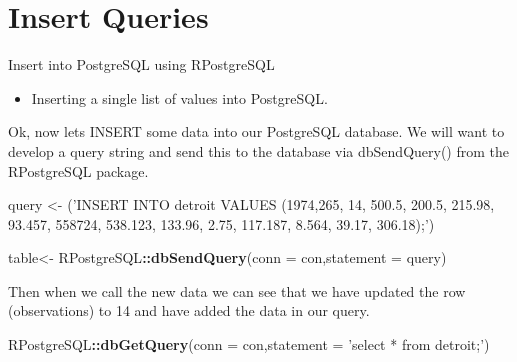 \documentclass[]{book}
\newenvironment{Shaded}{\begin{snugshade}}{\end{snugshade}}
\newcommand{\KeywordTok}[1]{\textcolor[rgb]{0.13,0.29,0.53}{\textbf{#1}}}
\newcommand{\DataTypeTok}[1]{\textcolor[rgb]{0.13,0.29,0.53}{#1}}
\newcommand{\StringTok}[1]{\textcolor[rgb]{0.31,0.60,0.02}{#1}}
\newcommand{\OperatorTok}[1]{\textcolor[rgb]{0.81,0.36,0.00}{\textbf{#1}}}
\newcommand{\NormalTok}[1]{#1}
\providecommand{\tightlist}{%
  \setlength{\itemsep}{0pt}\setlength{\parskip}{0pt}}
\begin{document}
\section{Insert Queries}\label{insert-queries}

Insert into PostgreSQL using RPostgreSQL

\begin{itemize}
\tightlist
\item
  Inserting a single list of values into PostgreSQL.
\end{itemize}

Ok, now lets INSERT some data into our PostgreSQL database. We will want
to develop a query string and send this to the database via
dbSendQuery() from the RPostgreSQL package.

\begin{Shaded}
\begin{Highlighting}[]
\NormalTok{query <-}\StringTok{ }\NormalTok{(}\StringTok{'INSERT INTO detroit VALUES (1974,265, 14, 500.5, 200.5, 215.98, 93.457, 558724, 538.123, 133.96, 2.75, 117.187, 8.564, 39.17, 306.18);'}\NormalTok{)}

\NormalTok{table<-}\StringTok{ }\NormalTok{RPostgreSQL}\OperatorTok{::}\KeywordTok{dbSendQuery}\NormalTok{(}\DataTypeTok{conn =}\NormalTok{ con,}\DataTypeTok{statement =}\NormalTok{ query)}
\end{Highlighting}
\end{Shaded}

Then when we call the new data we can see that we have updated the row
(observations) to 14 and have added the data in our query.

\begin{Shaded}
\begin{Highlighting}[]
\NormalTok{RPostgreSQL}\OperatorTok{::}\KeywordTok{dbGetQuery}\NormalTok{(}\DataTypeTok{conn =}\NormalTok{ con,}\DataTypeTok{statement =} \StringTok{'select * from detroit;'}\NormalTok{)}
\end{Highlighting}
\end{Shaded}
\end{document}

